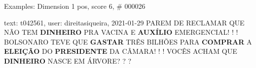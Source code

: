 \begin{frame}{Examples: Dimension 1 pos, score 6, \# 000026}
\footnotesize
\begin{exampleblock}{text: t042561, user: direitasiqueira, 2021-01-29}
PAREM DE RECLAMAR QUE NÃO TEM \textbf{DINHEIRO} PRA VACINA E \textbf{AUXÍLIO} 
EMERGENCIAL! ! !  BOLSONARO TEVE QUE 
\textbf{GASTAR} TRÊS BILHÕES PARA \textbf{COMPRAR} A \textbf{ELEIÇÃO} DO 
\textbf{PRESIDENTE} DA CÂMARA! ! ! VOCÊS ACHAM QUE \textbf{DINHEIRO} NASCE EM 
ÁRVORE? ? ?  
\end{exampleblock}
\end{frame}
